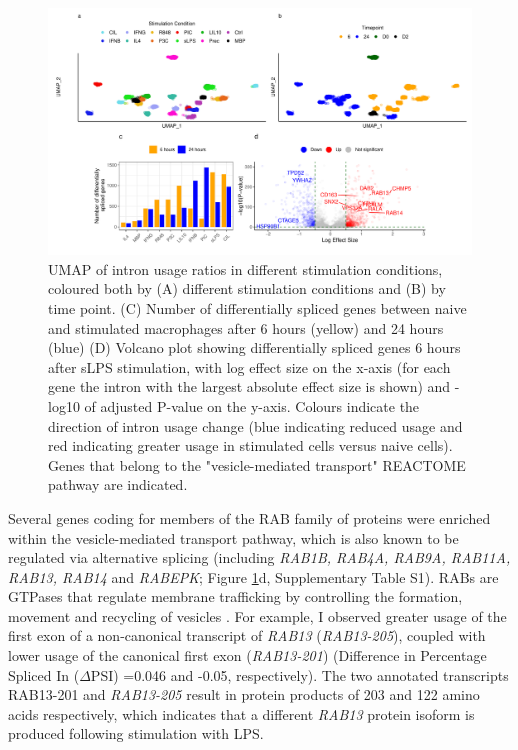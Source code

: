 \begin{figure}
  \centering
  \includegraphics[width=\textwidth]{ds}
  \caption{ UMAP of intron usage ratios in different stimulation conditions, coloured both by (A) different stimulation conditions and (B) by time point. (C) Number of differentially spliced genes between naive and stimulated macrophages after 6 hours (yellow) and 24 hours (blue) (D) Volcano plot showing differentially spliced genes 6 hours after sLPS stimulation, with log effect size on the x-axis (for each gene the intron with the largest absolute effect size is shown) and -log10 of adjusted P-value on the y-axis. Colours indicate the direction of intron usage change (blue indicating reduced usage and red indicating greater usage in stimulated cells versus naive cells). Genes that belong to the "vesicle-mediated transport" REACTOME pathway are indicated.}
  \label{fig:ds}   
\end{figure}
Several genes coding for members of the RAB family of proteins were enriched within the vesicle-mediated transport pathway, which is also known to be regulated via alternative splicing \cite{Green2020-lf} (including \textit{RAB1B, RAB4A, RAB9A, RAB11A, RAB13, RAB14} and \textit{RABEPK}; Figure \ref{fig:ds}d, Supplementary Table S1). RABs are GTPases that regulate membrane trafficking by controlling  the formation, movement and recycling of vesicles \cite{Stenmark2009-ju}. For example, I observed greater usage of the first exon of a non-canonical transcript of \textit{RAB13} (\textit{RAB13-205}), coupled with lower usage of the canonical first exon (\textit{RAB13-201}) (Difference in Percentage Spliced In ($\Delta$PSI) =0.046 and -0.05, respectively). The two annotated transcripts RAB13-201 and \textit{RAB13-205} result in protein products of 203 and 122 amino acids respectively, which indicates that a different \textit{RAB13} protein isoform is produced following stimulation with LPS.\\


